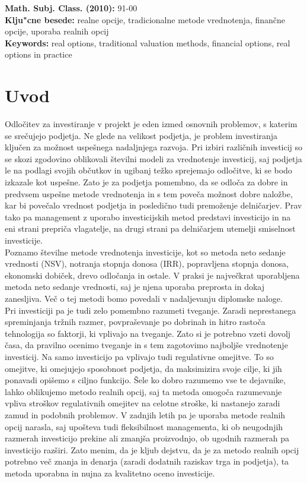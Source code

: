 \documentclass[12pt, a4paper]{amsart}
\theoremstyle{definition} %
\theoremstyle{plain} %
\begin{document}
\vfill\noindent
{\bf Math. Subj. Class. (2010):} 	91-00   \\[1mm]  
{\bf Klju"cne besede:} realne opcije, tradicionalne metode vrednotenja, finančne opcije, uporaba realnih opcij  \\[1mm]  
{\bf Keywords:} real options, traditional valuation methods, financial options, real options in practice
\pagebreak


\section{Uvod}
Odločitev za investiranje v projekt je eden izmed osnovnih problemov, s katerim se srečujejo podjetja. Ne glede na velikost podjetja, je problem investiranja ključen za možnost uspešnega nadaljnjega razvoja. Pri izbiri različnih investicij so se skozi zgodovino oblikovali številni modeli za vrednotenje investicij, saj podjetja le na podlagi svojih občutkov in ugibanj težko sprejemajo odločitve, ki se bodo izkazale kot uspešne. Zato je za podjetja pomembno, da se odloča za dobre in predvsem uspešne metode vrednotenja in s tem poveča možnost dobre naložbe, kar bi povečalo vrednost podjetja in posledično tudi premoženje delničarjev. Prav tako pa management z uporabo investicijskih metod predstavi investicijo in na eni strani prepriča vlagatelje, na drugi strani pa delničarjem utemelji smiselnost investicije.\\

Poznamo številne metode vrednotenja investicije, kot so metoda neto sedanje vrednosti (NSV), notranja stopnja donosa (IRR), popravljena stopnja donosa, ekonomski dobiček, drevo odločanja in ostale. V praksi je največkrat uporabljena metoda neto sedanje vrednosti, saj je njena uporaba preprosta in dokaj zanesljiva. Več o tej metodi bomo povedali v nadaljevanju diplomske naloge. \\

Pri investiciji pa je tudi zelo pomembno razumeti tveganje. Zaradi neprestanega spreminjanja tržnih razmer, povpraševanje po dobrinah in hitro rastoča tehnologija so faktorji, ki vplivajo na tveganje. Zato si je potrebno vzeti dovolj časa, da pravilno ocenimo tveganje in s tem zagotovimo najboljše vrednotenje investicij. Na samo investicijo pa vplivajo tudi regulativne omejitve. To so omejitve, ki omejujejo sposobnost podjetja, da maksimizira svoje cilje, ki jih ponavadi opišemo s ciljno funkcijo. Šele ko dobro razumemo vse te dejavnike, lahko oblikujemo metodo realnih opcij, saj ta metoda omogoča razumevanje vpliva stroškov regulativnih omejitev na celotne stroške, ki nastanejo zaradi zamud in podobnih problemov. V zadnjih letih pa je uporaba metode realnih opcij narasla, saj upošteva tudi fleksibilnost managementa, ki ob neugodnjih razmerah investicijo prekine ali zmanjša proizvodnjo, ob ugodnih razmerah pa investicijo razširi. Zato menim, da je kljub dejstvu, da je za metodo realnih opcij potrebno več znanja in denarja (zaradi dodatnih raziskav trga in podjetja), ta metoda uporabna in nujna za kvalitetno oceno investicije.   \\   
\end{document}
